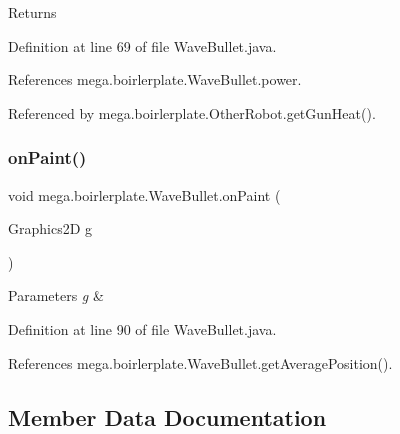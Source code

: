 \begin{DoxyReturn}{Returns}

\end{DoxyReturn}


Definition at line 69 of file Wave\+Bullet.\+java.



References mega.\+boirlerplate.\+Wave\+Bullet.\+power.



Referenced by mega.\+boirlerplate.\+Other\+Robot.\+get\+Gun\+Heat().

\mbox{\label{classmega_1_1boirlerplate_1_1_wave_bullet_ad9d1a8f6a2058d1192dea650aa3d17f8}} 
\subsubsection{\texorpdfstring{on\+Paint()}{onPaint()}}
{\footnotesize\ttfamily void mega.\+boirlerplate.\+Wave\+Bullet.\+on\+Paint (\begin{DoxyParamCaption}\item[{Graphics2D}]{g }\end{DoxyParamCaption})}


\begin{DoxyParams}{Parameters}
{\em g} & \\
\hline
\end{DoxyParams}


Definition at line 90 of file Wave\+Bullet.\+java.



References mega.\+boirlerplate.\+Wave\+Bullet.\+get\+Average\+Position().



\subsection{Member Data Documentation}
\mbox{\label{classmega_1_1boirlerplate_1_1_wave_bullet_a26da8c37f3ae2820d9cf938b4fd2af0f}} 
